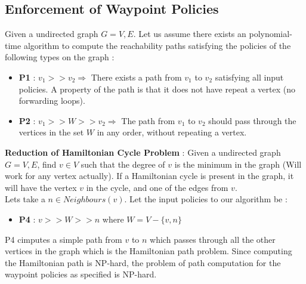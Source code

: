  \subsection{Enforcement of Waypoint Policies}
 Given a undirected graph $G={V,E}$. Let us assume there exists an polynomial-time algorithm to compute the reachability paths satisfying the policies of the following types on the graph : \\
 \begin{itemize} 
 	\item \textbf{P1} : $v_1 >> v_2 \Rightarrow$ There exists a path from $v_1$ to $v_2$ satisfying all input policies. A property of the path is that it does not have repeat a vertex (no forwarding loops).
 	\item \textbf{P2} : $v_1 >> W >> v_2 \Rightarrow$ The path from $v_1$ to $v_2$  should pass through the vertices in the set $W$ in any order, without repeating a vertex.
 \end{itemize}
 \textbf{Reduction of Hamiltonian Cycle Problem} : Given a undirected graph $G={V,E}$, find $v \in V$ such that the degree of $v$ is the minimum in the graph (Will work for any vertex actually). If a Hamiltonian cycle is present in the graph, it will have the vertex $v$ in the cycle, and one of the edges from $v$.  \\
 Lets take a $n \in Neighbours(v)$. Let the input policies to our algorithm be : 
 \begin{itemize}
 	\item \textbf{P4} : $v >> W >> n$ where $W = V - \{v,n\} $ 
 \end{itemize}
P4 cimputes a simple path from $v$ to $n$ which passes through all the other vertices in the graph which is the Hamiltonian path problem. Since computing the Hamiltonian path is NP-hard, the problem of path computation for the waypoint policies as specified is NP-hard. 